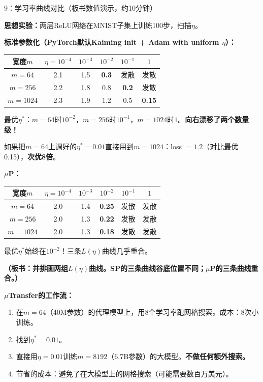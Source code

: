 \documentclass[11pt,a4paper]{article}
\begin{document}
\begin{handcalc}{9：学习率曲线对比（板书数值演示，约10分钟）}

\textbf{思想实验：}两层ReLU网络在MNIST子集上训练100步，扫描$\eta$。

\tcblower

\textbf{标准参数化（PyTorch默认Kaiming init + Adam with uniform $\eta$）：}

\begin{center}
\begin{tabular}{c|ccccc}
\toprule
宽度$m$ & $\eta=10^{-4}$ & $10^{-3}$ & $10^{-2}$ & $10^{-1}$ & $1$ \\
\midrule
$m=64$ & 2.1 & 1.5 & \cellcolor{yellow!30}\textbf{0.3} & 发散 & 发散 \\
$m=256$ & 2.2 & 1.8 & 0.8 & \cellcolor{yellow!30}\textbf{0.2} & 发散 \\
$m=1024$ & 2.3 & 1.9 & 1.2 & 0.5 & \cellcolor{yellow!30}\textbf{0.15} \\
\bottomrule
\end{tabular}
\end{center}

最优$\eta^*$：$m=64$时$10^{-2}$，$m=256$时$10^{-1}$，$m=1024$时$1$。\textbf{向右漂移了两个数量级！}

如果把$m=64$上调好的$\eta^*=0.01$直接用到$m=1024$：loss $= 1.2$（对比最优0.15），\textbf{次优8倍}。

\bigskip
\textbf{$\mu$P：}

\begin{center}
\begin{tabular}{c|ccccc}
\toprule
宽度$m$ & $\eta=10^{-4}$ & $10^{-3}$ & $10^{-2}$ & $10^{-1}$ & $1$ \\
\midrule
$m=64$ & 2.0 & 1.4 & \cellcolor{green!20}\textbf{0.25} & 发散 & 发散 \\
$m=256$ & 2.0 & 1.3 & \cellcolor{green!20}\textbf{0.22} & 发散 & 发散 \\
$m=1024$ & 2.0 & 1.3 & \cellcolor{green!20}\textbf{0.18} & 发散 & 发散 \\
\bottomrule
\end{tabular}
\end{center}

最优$\eta^*$始终在$10^{-2}$！三条$L(\eta)$曲线几乎重合。

\textbf{（板书：并排画两组$L(\eta)$曲线。SP的三条曲线谷底位置不同；$\mu$P的三条曲线重合。）}

\bigskip
\textbf{$\mu$Transfer的工作流：}
\begin{enumerate}[leftmargin=*]
\item 在$m=64$（40M参数）的代理模型上，用8个学习率跑网格搜索。成本：8次小训练。
\item 找到$\eta^*=0.01$。
\item 直接用$\eta=0.01$训练$m=8192$（6.7B参数）的大模型。\textbf{不做任何额外搜索。}
\item 节省的成本：避免了在大模型上的网格搜索（可能需要数百万美元）。
\end{enumerate}
\end{handcalc}
\end{document}
